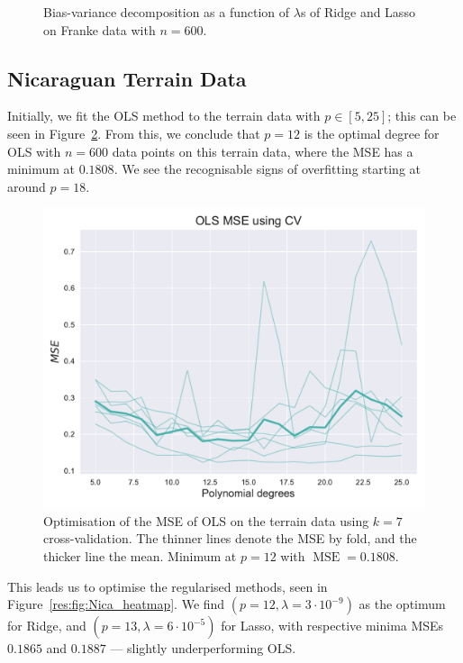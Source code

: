 \documentclass[twocolumn,english,notitlepage]{article}
\DeclareMathOperator{\mse}{MSE}
\begin{document}
\begin{figure}[ht]
\begin{subfigure}{\linewidth}
                \end{subfigure}
                \caption{Bias-variance decomposition as a function of $\lambda$s of Ridge and Lasso on Franke data with $n=600$.}
                \label{res:fig:bs_bias_var_lmbdas_Ridge_Lasso}
            \end{figure}





    \subsection{Nicaraguan Terrain Data}
        Initially, we fit the OLS method to the terrain data with $p\in[5, 25]$; this can be seen in Figure~\ref{res:fig:Nica_OLS}. From this, we conclude that $p=12$ is the optimal degree for OLS with $n=600$ data points on this terrain data, where the MSE has a minimum at $0.1808$. We see the recognisable signs of overfitting starting at around $p=18$.
        \begin{figure} [ht]
            \centering
            \includegraphics[width=\linewidth]{OPT_OLS_mse_kfold.pdf}
            \caption{Optimisation of the MSE of OLS on the terrain data using $k=7$ cross-validation. The thinner lines denote the MSE by fold, and the thicker line the mean. Minimum at $p=12$ with $\mse = 0.1808$.}
            \label{res:fig:Nica_OLS}
        \end{figure}

        This leads us to optimise the regularised methods, seen in Figure~\ref{res:fig:Nica_heatmap}. We find $(p=12, \lambda = 3\cdot 10^{-9})$ as the optimum for Ridge, and $(p=13, \lambda=6 \cdot 10^{-5})$ for Lasso, with respective minima MSEs $0.1865$ and $0.1887$ --- slightly underperforming OLS.
    
\end{document}
